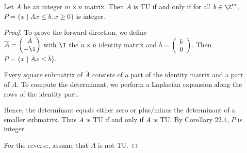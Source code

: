 \begin{thm}
Let $A$ be an integer $m \times n$ matrix.
Then $A$ is TU if and only if for all $b \in \Z^m$, $P = \{x \mid Ax \leq b,
x \geq 0\}$ is integer.
\end{thm}
\begin{proof}
To prove the forward direction, we define \\
$\overline{A} = \begin{pmatrix} A \\ -\I \end{pmatrix}$ with $\I$ the $n
\times n$ identity matrix and $\overline{b} = \begin{pmatrix} b \\ 0
\end{pmatrix}$.
Then $P = \{ x \mid \overline{A} x \leq \overline{b} \}$.

Every square submatrix of $\overline{A}$ consists of a part of the identity
matrix and a part of $A$. To compute the determinant, we perform a Laplacian
expansion along the rows of the identity part.

Hence, the determinant equals either zero or plus/minus the determinant of a
smaller submatrix. Thus $\overline{A}$ is TU if and only if $A$ is TU.
By Corollary 22.4, $P$ is integer.

For the reverse, assume that $A$ is not TU.
\end{proof}

